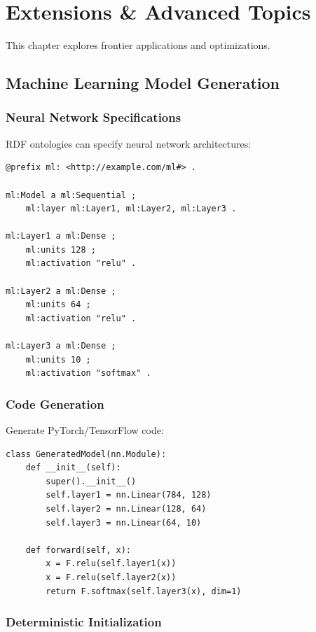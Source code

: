 \chapter{Extensions \& Advanced Topics}

This chapter explores frontier applications and optimizations.

\section{Machine Learning Model Generation}

\subsection{Neural Network Specifications}

RDF ontologies can specify neural network architectures:

\begin{verbatim}
@prefix ml: <http://example.com/ml#> .

ml:Model a ml:Sequential ;
    ml:layer ml:Layer1, ml:Layer2, ml:Layer3 .

ml:Layer1 a ml:Dense ;
    ml:units 128 ;
    ml:activation "relu" .

ml:Layer2 a ml:Dense ;
    ml:units 64 ;
    ml:activation "relu" .

ml:Layer3 a ml:Dense ;
    ml:units 10 ;
    ml:activation "softmax" .
\end{verbatim}

\subsection{Code Generation}

Generate PyTorch/TensorFlow code:

\begin{verbatim}
class GeneratedModel(nn.Module):
    def __init__(self):
        super().__init__()
        self.layer1 = nn.Linear(784, 128)
        self.layer2 = nn.Linear(128, 64)
        self.layer3 = nn.Linear(64, 10)

    def forward(self, x):
        x = F.relu(self.layer1(x))
        x = F.relu(self.layer2(x))
        return F.softmax(self.layer3(x), dim=1)
\end{verbatim}

\subsection{Deterministic Initialization}

